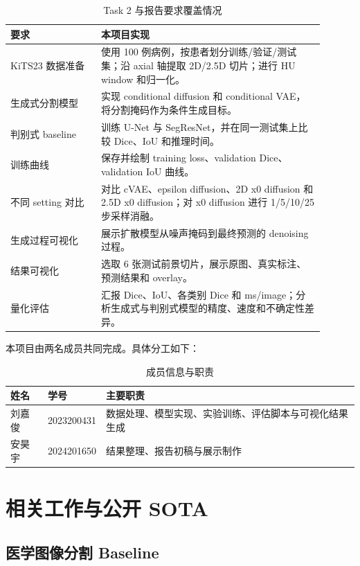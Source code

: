 \documentclass[lang=cn,11pt,a4paper]{elegantpaper}
\begin{document}
\begin{table}[H]
\centering
\caption{Task 2 与报告要求覆盖情况}
\label{tab:requirement_coverage}
\begin{tabular}{p{0.26\linewidth}p{0.64\linewidth}}
\toprule
要求 & 本项目实现 \\
\midrule
KiTS23 数据准备 & 使用 100 例病例，按患者划分训练/验证/测试集；沿 axial 轴提取 2D/2.5D 切片；进行 HU window 和归一化。 \\
生成式分割模型 & 实现 conditional diffusion 和 conditional VAE，将分割掩码作为条件生成目标。 \\
判别式 baseline & 训练 U-Net 与 SegResNet，并在同一测试集上比较 Dice、IoU 和推理时间。 \\
训练曲线 & 保存并绘制 training loss、validation Dice、validation IoU 曲线。 \\
不同 setting 对比 & 对比 cVAE、epsilon diffusion、2D x0 diffusion 和 2.5D x0 diffusion；对 x0 diffusion 进行 1/5/10/25 步采样消融。 \\
生成过程可视化 & 展示扩散模型从噪声掩码到最终预测的 denoising 过程。 \\
结果可视化 & 选取 6 张测试前景切片，展示原图、真实标注、预测结果和 overlay。 \\
量化评估 & 汇报 Dice、IoU、各类别 Dice 和 ms/image；分析生成式与判别式模型的精度、速度和不确定性差异。 \\
\bottomrule
\end{tabular}
\end{table}

本项目由两名成员共同完成。具体分工如下：

\begin{table}[H]
\centering
\caption{成员信息与职责}
\begin{tabular}{lll}
\toprule
姓名 & 学号 & 主要职责 \\
\midrule
刘嘉俊 & 2023200431 & 数据处理、模型实现、实验训练、评估脚本与可视化结果生成 \\
安昊宇 & 2024201650 & 结果整理、报告初稿与展示制作 \\
\bottomrule
\end{tabular}
\end{table}

\section{相关工作与公开 SOTA}

\subsection{医学图像分割 Baseline}
\end{document}
